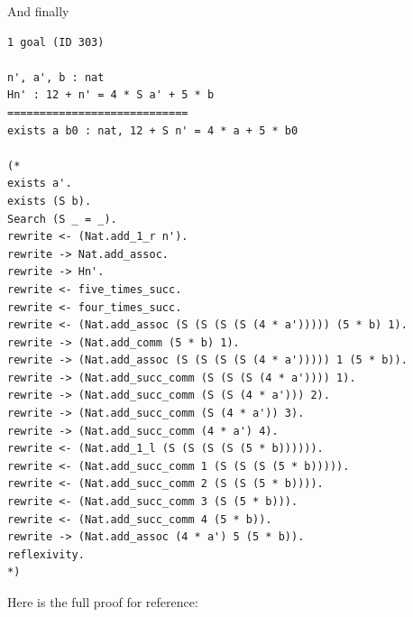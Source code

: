 \documentclass{article}
\begin{document}
And finally

\begin{lstlisting}
1 goal (ID 303)

n', a', b : nat
Hn' : 12 + n' = 4 * S a' + 5 * b
============================
exists a b0 : nat, 12 + S n' = 4 * a + 5 * b0

(*
exists a'.
exists (S b).
Search (S _ = _).
rewrite <- (Nat.add_1_r n').
rewrite -> Nat.add_assoc.
rewrite -> Hn'.
rewrite <- five_times_succ.
rewrite <- four_times_succ.
rewrite <- (Nat.add_assoc (S (S (S (S (4 * a'))))) (5 * b) 1).
rewrite -> (Nat.add_comm (5 * b) 1).
rewrite -> (Nat.add_assoc (S (S (S (S (4 * a'))))) 1 (5 * b)).
rewrite -> (Nat.add_succ_comm (S (S (S (4 * a')))) 1).
rewrite -> (Nat.add_succ_comm (S (S (4 * a'))) 2).
rewrite -> (Nat.add_succ_comm (S (4 * a')) 3).
rewrite -> (Nat.add_succ_comm (4 * a') 4).
rewrite <- (Nat.add_1_l (S (S (S (S (5 * b)))))).
rewrite <- (Nat.add_succ_comm 1 (S (S (S (5 * b))))).
rewrite <- (Nat.add_succ_comm 2 (S (S (5 * b)))).
rewrite <- (Nat.add_succ_comm 3 (S (5 * b))).
rewrite <- (Nat.add_succ_comm 4 (5 * b)).
rewrite -> (Nat.add_assoc (4 * a') 5 (5 * b)).
reflexivity.
*)
\end{lstlisting}

Here is the full proof for reference:
\end{document}
